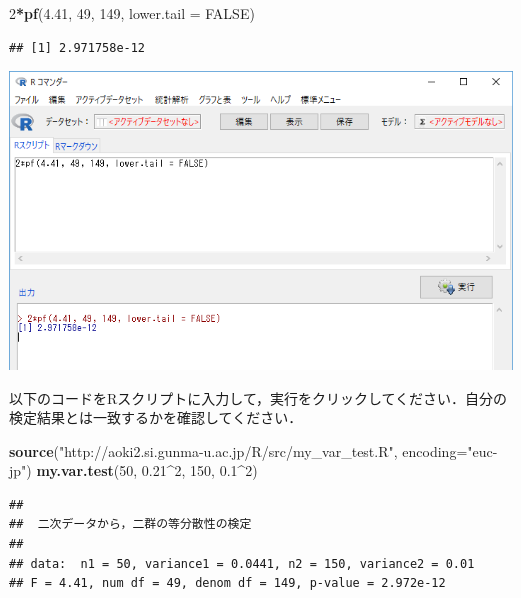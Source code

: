 \documentclass[11pt,]{problemset}
\newenvironment{Shaded}{\begin{snugshade}}{\end{snugshade}}
\newcommand{\DataTypeTok}[1]{\textcolor[rgb]{0.13,0.29,0.53}{#1}}
\newcommand{\DecValTok}[1]{\textcolor[rgb]{0.00,0.00,0.81}{#1}}
\newcommand{\FloatTok}[1]{\textcolor[rgb]{0.00,0.00,0.81}{#1}}
\newcommand{\KeywordTok}[1]{\textcolor[rgb]{0.13,0.29,0.53}{\textbf{#1}}}
\newcommand{\NormalTok}[1]{#1}
\newcommand{\OperatorTok}[1]{\textcolor[rgb]{0.81,0.36,0.00}{\textbf{#1}}}
\newcommand{\OtherTok}[1]{\textcolor[rgb]{0.56,0.35,0.01}{#1}}
\newcommand{\StringTok}[1]{\textcolor[rgb]{0.31,0.60,0.02}{#1}}
\begin{document}
\begin{Shaded}
\begin{Highlighting}[]
\DecValTok{2}\OperatorTok{*}\KeywordTok{pf}\NormalTok{(}\FloatTok{4.41}\NormalTok{, }\DecValTok{49}\NormalTok{, }\DecValTok{149}\NormalTok{, }\DataTypeTok{lower.tail =} \OtherTok{FALSE}\NormalTok{)}
\end{Highlighting}
\end{Shaded}

\begin{verbatim}
## [1] 2.971758e-12
\end{verbatim}

\begin{center}\includegraphics[width=0.9\linewidth]{pic/ftest} \end{center}
\bigskip

以下のコードをRスクリプトに入力して，実行をクリックしてください．自分の検定結果とは一致するかを確認してください．

\begin{Shaded}
\begin{Highlighting}[]
\KeywordTok{source}\NormalTok{(}\StringTok{"http://aoki2.si.gunma-u.ac.jp/R/src/my_var_test.R"}\NormalTok{, }\DataTypeTok{encoding=}\StringTok{"euc-jp"}\NormalTok{)}
\KeywordTok{my.var.test}\NormalTok{(}\DecValTok{50}\NormalTok{, }\FloatTok{0.21}\OperatorTok{^}\DecValTok{2}\NormalTok{, }\DecValTok{150}\NormalTok{, }\FloatTok{0.1}\OperatorTok{^}\DecValTok{2}\NormalTok{)}
\end{Highlighting}
\end{Shaded}

\begin{verbatim}
## 
##  二次データから，二群の等分散性の検定
## 
## data:  n1 = 50, variance1 = 0.0441, n2 = 150, variance2 = 0.01
## F = 4.41, num df = 49, denom df = 149, p-value = 2.972e-12
\end{verbatim}
\end{document}
